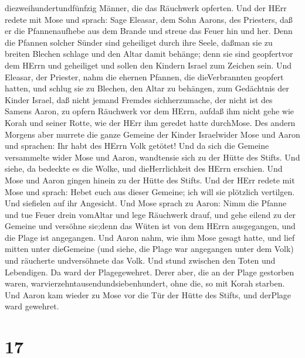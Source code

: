 diezweihundertundfünfzig Männer, die das Räuchwerk opferten.
 Und der HErr redete mit Mose und sprach: 
Sage Eleasar, dem Sohn Aarons, des Priesters, daß er die Pfannenaufhebe
aus dem Brande und streue das Feuer hin und her.  Denn die
Pfannen solcher Sünder sind geheiliget durch ihre Seele, daßman sie zu
breiten Blechen schlage und den Altar damit behänge; denn sie sind
geopfertvor dem HErrn und geheiliget und sollen den Kindern Israel zum
Zeichen sein.  Und Eleasar, der Priester, nahm die ehernen
Pfannen, die dieVerbrannten geopfert hatten, und schlug sie zu Blechen,
den Altar zu behängen,  zum Gedächtnis der Kinder Israel,
daß nicht jemand Fremdes sichherzumache, der nicht ist des Samens Aaron,
zu opfern Räuchwerk vor dem HErrn, aufdaß ihm nicht gehe wie Korah und
seiner Rotte, wie der HErr ihm geredet hatte durchMose. 
Des andern Morgens aber murrete die ganze Gemeine der Kinder Israelwider
Mose und Aaron und sprachen: Ihr habt des HErrn Volk getötet!
 Und da sich die Gemeine versammelte wider Mose und Aaron,
wandtensie sich zu der Hütte des Stifts. Und siehe, da bedeckte es die
Wolke, und dieHerrlichkeit des HErrn erschien.  Und Mose
und Aaron gingen hinein zu der Hütte des Stifts.  Und der
HErr redete mit Mose und sprach:  Hebet euch aus dieser
Gemeine; ich will sie plötzlich vertilgen. Und siefielen auf ihr
Angesicht.  Und Mose sprach zu Aaron: Nimm die Pfanne und
tue Feuer drein vomAltar und lege Räuchwerk drauf, und gehe eilend zu
der Gemeine und versöhne sie;denn das Wüten ist von dem HErrn
ausgegangen, und die Plage ist angegangen.  Und Aaron nahm,
wie ihm Mose gesagt hatte, und lief mitten unter dieGemeine (und siehe,
die Plage war angegangen unter dem Volk) und räucherte undversöhnete das
Volk.  Und stund zwischen den Toten und Lebendigen. Da ward
der Plagegewehret.  Derer aber, die an der Plage gestorben
waren, warvierzehntausendundsiebenhundert, ohne die, so mit Korah
starben.  Und Aaron kam wieder zu Mose vor die Tür der
Hütte des Stifts, und derPlage ward gewehret.

\hypertarget{section-16}{%
\section{17}\label{section-16}}

